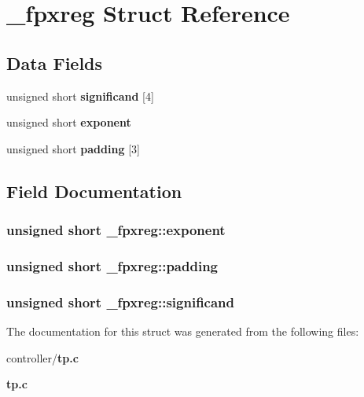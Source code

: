 \section{\_\-fpxreg Struct Reference}
\label{struct__fpxreg}
\subsection*{Data Fields}
\begin{DoxyCompactItemize}
\item 
unsigned short {\bf significand} [4]
\item 
unsigned short {\bf exponent}
\item 
unsigned short {\bf padding} [3]
\end{DoxyCompactItemize}


\subsection{Field Documentation}
\subsubsection[{exponent}]{\setlength{\rightskip}{0pt plus 5cm}unsigned short {\bf \_\-fpxreg::exponent}}\label{struct__fpxreg_a2348e3957cd950543945787c112b4b6e}
\subsubsection[{padding}]{\setlength{\rightskip}{0pt plus 5cm}unsigned short {\bf \_\-fpxreg::padding}}\label{struct__fpxreg_a13fc410819d1a6abc3929956f14fbb85}
\subsubsection[{significand}]{\setlength{\rightskip}{0pt plus 5cm}unsigned short {\bf \_\-fpxreg::significand}}\label{struct__fpxreg_a568266707f270a0484ef4ef416566fdb}


The documentation for this struct was generated from the following files:\begin{DoxyCompactItemize}
\item 
controller/{\bf tp.c}\item 
{\bf tp.c}\end{DoxyCompactItemize}
